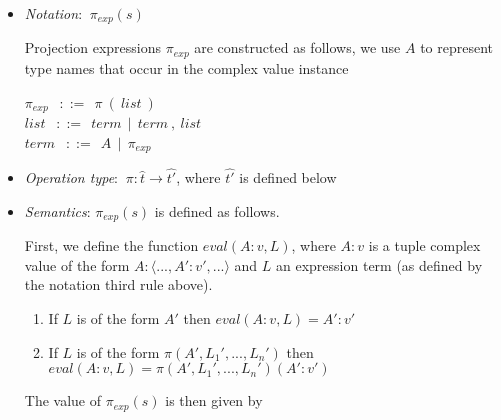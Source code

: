 \begin{itemize}
	\item \textit{Notation}: $\ \pi_{exp}(s)$
	
	Projection expressions $\pi_{exp}$ are constructed as follows, we use $A$ to represent type names that occur in the complex value instance

	\vspace{0.2cm}
   	\noindent \hspace*{1.5cm} $\pi_{exp}$ \hspace*{0.25cm} $\ \ ::= \ \ \pi \ ( \ list \ ) \ \ $ \\
   	\noindent \hspace*{1.5cm} $list$ \hspace*{0.26cm} $\ \ ::= \ \ term \ \ | \ \ term \ , \ list \ \ $ \\
   	\noindent \hspace*{1.5cm} $term$ \hspace*{0.0cm} $\ \ ::= \ \ A \ \ | \ \ \pi_{exp} \ \ $ \\
	\vspace{0.2cm}
	
	\item \textit{Operation type}:
	$\ \pi:\hat{t} \rightarrow \hat{t'}$, where $\hat{t'}$ is defined below
	
	\item \textit{Semantics}: $\pi_{exp}(s)$ is defined as follows.
	
	First, we define the function $eval(A:v, L)$, where $A:v$ is a tuple complex value of the form
	$A:\langle ...,A':v',... \rangle$ and $L$ an expression term (as defined by the notation third rule above).
	
	\begin{enumerate}
		\item If $L$ is of the form $A'$ then $eval(A:v, L)=A':v'$
		\item If $L$ is of the form $\pi(A', L_1',...,L_n')$ then $eval(A:v, L) = \pi(A', L_1',...,L_n')(A':v')$
	\end{enumerate}

	The value of $\pi_{exp}(s)$ is then given by


\end{itemize}
